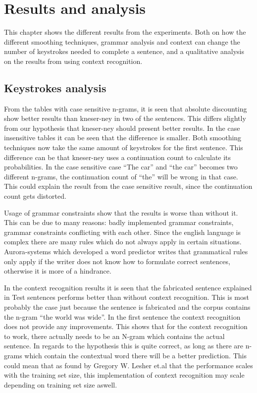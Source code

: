\section{Results and analysis}
This chapter shows the different results from the experiments. Both on how the different smoothing techniques, grammar analysis and context can change the number of keystrokes needed to complete a sentence, and a qualitative analysis on the results from using context recognition.

\subsection{Keystrokes analysis}
From the tables with case sensitive n-grams, it is seen that absolute discounting show better results than kneser-ney in two of the sentences. This differs slightly from our hypothesis that kneser-ney should present better results. In the case insensitive tables it can be seen that the difference is smaller. Both smoothing techniques now take the same amount of keystrokes for the first sentence. This difference can be that kneser-ney uses a continuation count to calculate its probabilities. In the case sensitive case “The car” and “the car” becomes two different n-grams, the continuation count of “the” will be wrong in that case. This could explain the result from the case sensitive result, since the continuation count gets distorted. 

Usage of grammar constraints show that the results is worse than without it. This can be due to many reasons: badly implemented grammar constraints, grammar constraints conflicting with each other. Since the english language is complex there are many rules which do not always apply in certain situations. Aurora-systems which developed a word predictor writes that grammatical rules only apply if the writer does not know how to formulate correct sentences, otherwise it is more of a hindrance\cite{aurora}.

In the context recognition results it is seen that the fabricated sentence explained in Test sentences performs better than without context recognition. This is most probably the case just because the sentence is fabricated and the corpus contains the n-gram “the world was wide”. In the first sentence the context recognition does not provide any improvements. This shows that for the context recognition to work, there actually needs to be an N-gram which contains the actual sentence. In regards to the hypothesis this is quite correct, as long as there are n-grams which contain the contextual word there will be a better prediction. This could mean that as found by Gregory W. Lesher et.al that the performance scales with the training set size\cite{Lesher99effectsof}, this implementation of context recognition may scale depending on training set size aswell.
\vspace{1em}
